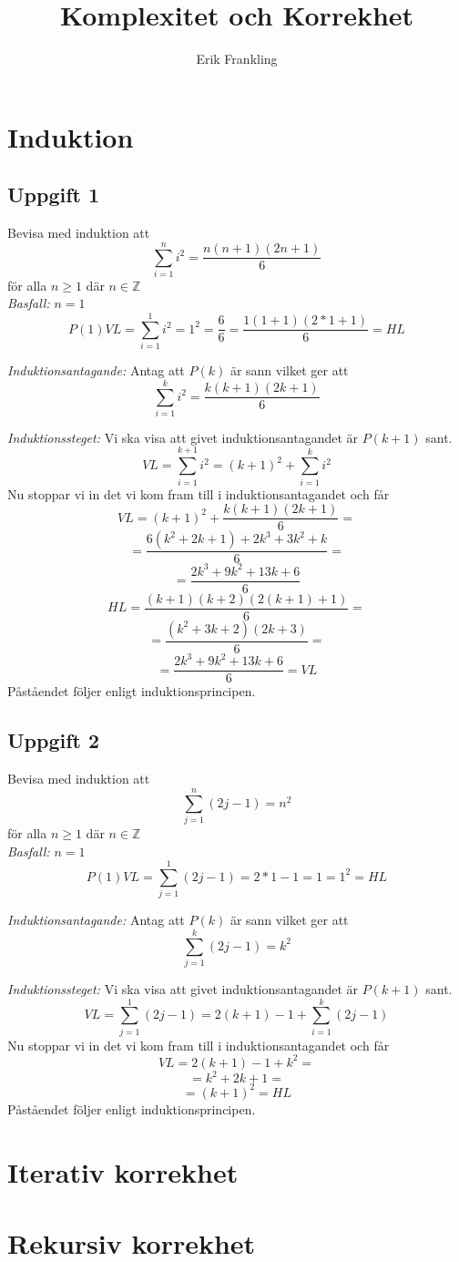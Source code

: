 \documentclass{article}
\title{Komplexitet och Korrekhet}
\author{Erik Frankling}
\begin{document}
\section{Induktion}
\subsection{Uppgift 1}
Bevisa med induktion att 
\[ \sum_{i=1}^{n} i ^ 2 = \frac{n (n + 1) (2n + 1)}{6} \] 
för alla $n \ge 1$ där $n \in \mathbb{Z}$\\


\textit{Basfall:} $n = 1$
\[ P(1) VL = \sum_{i=1}^{1} i ^ 2  = 1 ^ 2 = \frac{6}{6} = \frac{1 (1 + 1) (2 * 1 + 1)}{6} = HL \]

\textit{Induktionsantagande:} Antag att $P(k)$ är sann vilket ger att 
\[ \sum_{i=1}^{k} i ^ 2 = \frac{k (k + 1) (2k + 1)}{6} \]

\textit{Induktionssteget:}
Vi ska visa att givet induktionsantagandet är $P(k + 1)$ sant.
\[ VL = \sum_{i=1}^{k + 1} i ^ 2 = (k + 1) ^ 2 + \sum_{i=1}^{k} i ^ 2 \]
Nu stoppar vi in det vi kom fram till i induktionsantagandet och får
\[ VL = (k + 1) ^ 2 + \frac{k (k + 1) (2k + 1)}{6} = \]
\[ = \frac{ 6 (k ^ 2 + 2k + 1) + 2k ^ 3 + 3k ^ 2 + k}{6} = \]
\[ = \frac{ 2k ^ 3 + 9k ^ 2 + 13k + 6 }{6}\]
\[ HL = \frac{(k + 1) (k + 2) (2 (k + 1) + 1)}{6} = \]
\[ = \frac{(k ^ 2 + 3k + 2) (2k + 3)}{6} = \]
\[ = \frac{2k ^ 3 + 9k ^ 2 + 13k + 6}{6} = VL \]
Påståendet följer enligt induktionsprincipen.

\subsection{Uppgift 2}
Bevisa med induktion att 
\[ \sum_{j=1}^{n} (2j - 1) = n ^ 2 \]
för alla $n \ge 1$ där $n \in \mathbb{Z}$\\


\textit{Basfall:} $n = 1$
\[ P(1) VL = \sum_{j=1}^{1} (2j - 1)  = 2 * 1 - 1 = 1 = 1 ^ 2 = HL \]

\textit{Induktionsantagande:} Antag att $P(k)$ är sann vilket ger att 
\[ \sum_{j=1}^{k} (2j - 1) = k ^ 2 \]

\textit{Induktionssteget:}
Vi ska visa att givet induktionsantagandet är $P(k + 1)$ sant.
\[ VL = \sum_{j=1}^{1} (2j - 1) = 2 (k + 1) - 1 + \sum_{i=1}^{k} (2j - 1) \]
Nu stoppar vi in det vi kom fram till i induktionsantagandet och får
\[ VL = 2 (k + 1) - 1 + k ^ 2 = \]
\[ = k ^ 2 + 2k + 1 = \]
\[ = (k + 1) ^ 2 = HL \]
Påståendet följer enligt induktionsprincipen.
\section{Iterativ korrekhet}

\section{Rekursiv korrekhet}
\end{document}
